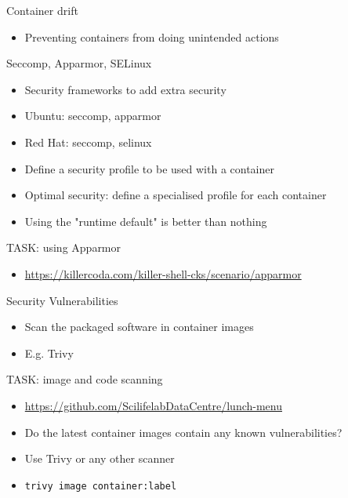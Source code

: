 \documentclass{dcpresentation}
\begin{document}
\begin{frame}{Container drift}
 \begin{itemize}
  \item Preventing containers from doing unintended actions
 \end{itemize}
\end{frame}

\begin{frame}{Seccomp, Apparmor, SELinux}
  \begin{itemize}
  \item Security frameworks to add extra security
  \item Ubuntu: seccomp, apparmor
  \item Red Hat: seccomp, selinux
  \item Define a security profile to be used with a container
  \item Optimal security: define a specialised profile for each container
  \item Using the "runtime default" is better than nothing
  \end{itemize}
\end{frame}

\begin{frame}{TASK: using Apparmor}
 \begin{itemize}
  \item \url{https://killercoda.com/killer-shell-cks/scenario/apparmor}
 \end{itemize}
\end{frame}


\begin{frame}{Security Vulnerabilities}
  \begin{itemize}
  \item Scan the packaged software in container images
  \item E.g. Trivy
  \end{itemize}
\end{frame}


\begin{frame}{TASK: image and code scanning}
  \begin{itemize}
  \item \url{https://github.com/ScilifelabDataCentre/lunch-menu}
  \item Do the latest container images contain any known vulnerabilities?
  \item Use Trivy or any other scanner
  \item \texttt{trivy image container:label}
  \end{itemize}
\end{frame}
\end{document}
